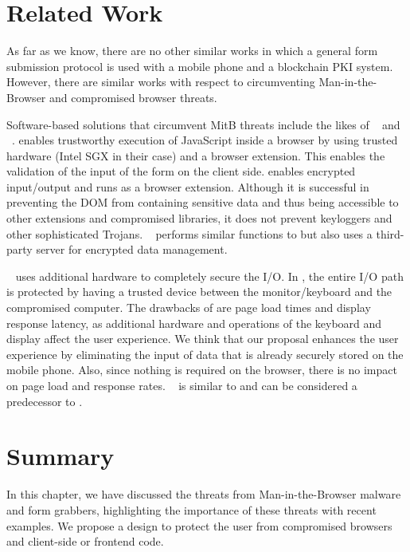 \section{Related Work}
\label{sec:rel}
As far as we know, there are no other similar works in which a general form submission protocol is used with a mobile phone and a blockchain PKI system. However, there are similar works with respect to circumventing Man-in-the-Browser and compromised browser threats.

Software-based solutions that circumvent MitB threats include the likes of ~\cite{goltzsche_trustjs:_2017} and ~\cite{he_shadowcrypt:_2014}.  enables trustworthy execution of JavaScript inside a browser by using trusted hardware (Intel SGX in their case) and a browser extension. This enables the validation of the input of the form on the client side.  enables encrypted input/output and runs as a browser extension. Although it is successful in preventing the DOM from containing sensitive data and thus being accessible to other extensions and compromised libraries, it does not prevent keyloggers and other sophisticated Trojans. ~\cite{noauthor_privly_nodate} performs similar functions to  but also uses a third-party server for encrypted data management.

~\cite{eskandarian_fidelius_2019} uses additional hardware to completely secure the I/O. In , the entire I/O path is protected by having a trusted device between the monitor/keyboard and the compromised computer. The drawbacks of  are page load times and display response latency, as additional hardware and operations of the keyboard and display affect the user experience. We think that our proposal enhances the user experience by eliminating the input of data that is already securely stored on the mobile phone. Also, since nothing is required on the browser, there is no impact on page load and response rates. ~\cite{mccune_safe_2009} is similar to  and can be considered a predecessor to .

\section{Summary}
\label{chp7::sec::summary}
In this chapter, we have discussed the threats from Man-in-the-Browser malware and form grabbers, highlighting the importance of these threats with recent examples. We propose a design to protect the user from compromised browsers and client-side or frontend code.


